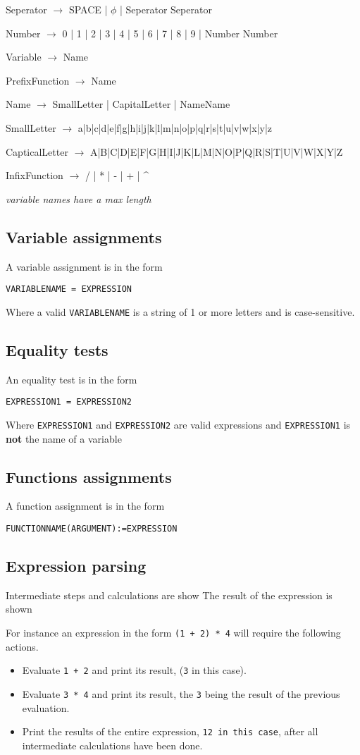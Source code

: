 \documentclass[11pt,a4paper]{article}
\begin{document}
Seperator \(\rightarrow\) SPACE | \(\phi\) | Seperator Seperator

Number \(\rightarrow\) 0 | 1 | 2 | 3 | 4 | 5 | 6 | 7 | 8 | 9 | Number Number

Variable \(\rightarrow\) Name

PrefixFunction \(\rightarrow\) Name

Name \(\rightarrow\) SmallLetter | CapitalLetter | NameName

SmallLetter \(\rightarrow\) a|b|c|d|e|f|g|h|i|j|k|l|m|n|o|p|q|r|s|t|u|v|w|x|y|z

CapticalLetter \(\rightarrow\) A|B|C|D|E|F|G|H|I|J|K|L|M|N|O|P|Q|R|S|T|U|V|W|X|Y|Z

InfixFunction \(\rightarrow\) / | * | - | + | \^{}

\emph{variable names have a max length}


\subsection{Variable assignments}
A variable assignment is in the form

\texttt{VARIABLENAME = EXPRESSION}

Where a valid \texttt{VARIABLENAME} is a string of 1 or more letters and
is case-sensitive.
\subsection{Equality tests}
An equality test is in the form

\texttt{EXPRESSION1 = EXPRESSION2}

Where \texttt{EXPRESSION1} and \texttt{EXPRESSION2} are valid expressions and
\texttt{EXPRESSION1} is \textbf{not} the name of a variable

\subsection{Functions assignments}
A function assignment is in the form

\texttt{FUNCTIONNAME(ARGUMENT):=EXPRESSION}
\subsection{Expression parsing}
Intermediate steps and calculations are show
The result of the expression is shown

For instance an expression in the form \texttt{(1 + 2) * 4} will require the following actions.

\begin{itemize}
\item Evaluate \texttt{1 + 2} and print its result, (\texttt{3} in this case).
\item Evaluate \texttt{3 * 4} and print its result, the \texttt{3} being the result of the previous evaluation.
\item Print the results of the entire expression, \texttt{12 in this case}, after all intermediate calculations have been done.
\end{itemize}
\end{document}

